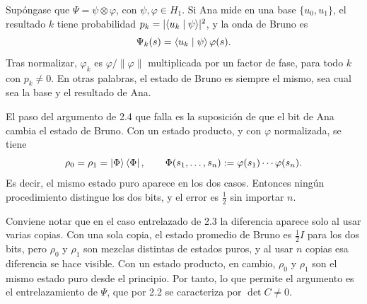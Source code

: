 Supóngase que $\Psi=\psi\otimes\varphi$, con $\psi,\varphi\in H_1$. Si Ana mide en una base $\{u_0,u_1\}$, el resultado $k$ tiene probabilidad $p_k=|\langle u_k\mid \psi\rangle|^2$, y la onda de Bruno es
\[
  \Psi_k(s)=\langle u_k\mid \psi\rangle\,\varphi(s).
\]
Tras normalizar, $\varphi_k$ es $\varphi/\|\varphi\|$ multiplicada por un factor de fase, para todo $k$ con $p_k\neq0$. En otras palabras, el estado de Bruno es siempre el mismo, sea cual sea la base y el resultado de Ana.

El paso del argumento de 2.4 que falla es la suposición de que el bit de Ana cambia el estado de Bruno. Con un estado producto, y con $\varphi$ normalizada, se tiene
\[
  \rho_0=\rho_1=\lvert \Phi\rangle\bra{\Phi},\qquad \Phi(s_1,\dots,s_n):=\varphi(s_1)\cdots\varphi(s_n).
\]
Es decir, el mismo estado puro aparece en los dos casos. Entonces ningún procedimiento distingue los dos bits, y el error es $\frac12$ sin importar $n$.

Conviene notar que en el caso entrelazado de 2.3 la diferencia aparece solo al usar varias copias. Con una sola copia, el estado promedio de Bruno es $\frac12 I$ para los dos bits, pero $\rho_0$ y $\rho_1$ son mezclas distintas de estados puros, y al usar $n$ copias esa diferencia se hace visible. Con un estado producto, en cambio, $\rho_0$ y $\rho_1$ son el mismo estado puro desde el principio. Por tanto, lo que permite el argumento es el entrelazamiento de $\Psi$, que por 2.2 se caracteriza por $\det C\neq0$.
